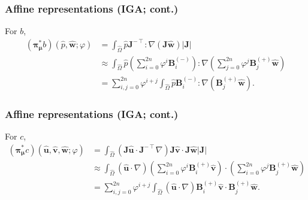 \begin{frame}
  \frametitle{Affine representations (IGA; cont.)}

  For $b$,
  \begin{align*}
    \nonumber
    ({\bm\pi}^*_{\bm\mu}b)(
    \hat{p},
    \hat{\bm w};
    \varphi
    ) &= \int_{\hat{\Omega}} \hat{p} \bm J^{-\intercal} : \nabla (\bm J \hat{\bm w}) |\bm J| \\
    & \approx \int_{\hat{\Omega}} \hat{p}
      \left( \sum_{i=0}^{2n} \varphi^i \bm B^{(-)}_i \right) : \nabla
      \left( \sum_{j=0}^{2n} \varphi^j \bm B^{(+)}_j \hat{\bm w} \right) \\
      &= \sum_{i,j=0}^{2n} \varphi^{i+j}
        \int_{\hat{\Omega}} \hat{p} \bm B^{(-)}_i :
        \nabla \left( \bm B^{(+)}_j \hat{\bm w} \right).
  \end{align*}
\end{frame}

\begin{frame}
  \frametitle{Affine representations (IGA; cont.)}

  For $c$,
  \begin{align*}
    \nonumber
    ({\bm\pi}^*_{\bm\mu}c)(
    \hat{\bm u},
    \hat{\bm v},
    \hat{\bm w};
    \varphi
    )
    &= \int_{\hat{\Omega}} (\bm J \hat{\bm u} \cdot \bm J^{-\intercal}\nabla)
      \bm J \hat{\bm v} \cdot \bm J \hat{\bm w} |\bm J| \\
      & \approx \int_{\hat{\Omega}} (\hat{\bm u} \cdot \nabla)
      \left( \sum_{i=0}^{2n} \varphi^i \bm B^{(+)}_i \hat{\bm v} \right) \cdot
      \left( \sum_{i=0}^{2n} \varphi^j \bm B^{(+)}_j \hat{\bm w} \right) \\
    &= \sum_{i,j=0}^{2n} \varphi^{i+j}
      \int_{\hat{\Omega}} (\hat{\bm u} \cdot \nabla) \bm B^{(+)}_i \hat{\bm v} \cdot \bm B^{(+)}_j \hat{\bm w}.
  \end{align*}
\end{frame}

